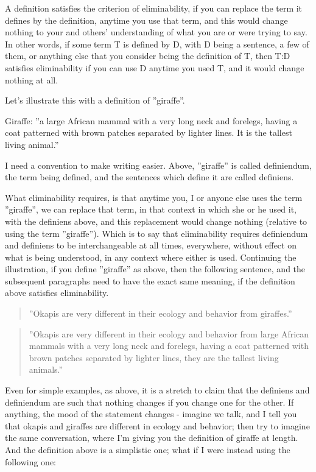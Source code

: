 \documentclass[graybox,envcountchap,sectrefs]{svmono}
\begin{document}
A definition satisfies the criterion of eliminability, if you can replace the term it defines by the definition, anytime you use that term, and this would change nothing to your and others' understanding of what you are or were trying to say. In other words, if some term T is defined by D, with D being a sentence, a few of them, or anything else that you consider being the definition of T, then T:D satisfies eliminability if you can use D anytime you used T, and it would change nothing at all.

Let's illustrate this with a definition of ''giraffe''. 

\begin{svgraybox}
Giraffe: ''a large African mammal with a very long neck and forelegs, having a coat patterned with brown patches separated by lighter lines. It is the tallest living animal.'' \cite{def-giraffe}
\end{svgraybox}

I need a convention to make writing easier. Above, ''giraffe'' is called definiendum, the term being defined, and the sentences which define it are called definiens.

What eliminability requires, is that anytime you, I or anyone else uses the term ''giraffe'', we can replace that term, in that context in which she or he used it, with the definiens above, and this replacement would change nothing (relative to using the term ''giraffe''). Which is to say that eliminability requires definiendum and definiens to be interchangeable at all times, everywhere, without effect on what is being understood, in any context where either is used. Continuing the illustration, if you define ''giraffe'' as above, then the following sentence, and the subsequent paragraphs need to have the exact same meaning, if the definition above satisfies eliminability.

\begin{quote}
''Okapis are very different in their ecology and behavior from giraffes.''
\end{quote}

\begin{quote}
''Okapis are very different in their ecology and behavior from large African mammals with a very long neck and forelegs, having a coat patterned with brown patches separated by lighter lines, they are the tallest living animals.''
\end{quote}

Even for simple examples, as above, it is a stretch to claim that the definiens and definiendum are such that nothing changes if you change one for the other. If anything, the mood of the statement changes - imagine we talk, and I tell you that okapis and giraffes are different in ecology and behavior; then try to imagine the same conversation, where I'm giving you the definition of giraffe at length. And the definition above is a simplistic one; what if I were instead using the following one:
\end{document}
